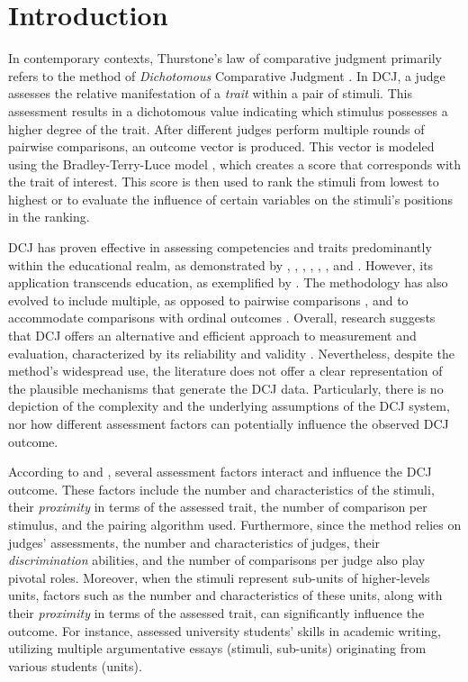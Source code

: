 \documentclass[
  authoryear,
  preprint,
  1p]{elsarticle}
\begin{document}
\section{Introduction}\label{sec-introduction}

In contemporary contexts, Thurstone's law of comparative judgment
\citeyearpar{Thurstone_1927} primarily refers to the method of
\emph{Dichotomous} Comparative Judgment
\citep[DCJ,][]{Pollitt_2012a, Pollitt_2012b}. In DCJ, a judge assesses
the relative manifestation of a \emph{trait} within a pair of stimuli.
This assessment results in a dichotomous value indicating which stimulus
possesses a higher degree of the trait. After different judges perform
multiple rounds of pairwise comparisons, an outcome vector is produced.
This vector is modeled using the Bradley-Terry-Luce model
\citep[BTL,][]{Bradley_et_al_1952, Luce_1959}, which creates a score
that corresponds with the trait of interest. This score is then used to
rank the stimuli from lowest to highest or to evaluate the influence of
certain variables on the stimuli's positions in the ranking.

DCJ has proven effective in assessing competencies and traits
predominantly within the educational realm, as demonstrated by
\citet{Pollitt_2012b}, \citet{Jones_2015}, \citet{vanDaal_et_al_2016},
\citet{Bartholomew_et_al_2018}, \citet{Lesterhuis_2018},
\citet{Bartholomew_et_al_2020}, and \citet{Marshall_et_al_2020}.
However, its application transcends education, as exemplified by
\citet{Boonen_et_al_2020}. The methodology has also evolved to include
multiple, as opposed to pairwise comparisons
\citep{Luce_1959, Placket_1975}, and to accommodate comparisons with
ordinal outcomes \citep{Tutz_1986, Agresti_1992}. Overall, research
suggests that DCJ offers an alternative and efficient approach to
measurement and evaluation, characterized by its reliability and
validity \citep{Lesterhuis_2018, vanDaal_2020, Marshall_et_al_2020}.
Nevertheless, despite the method's widespread use, the literature does
not offer a clear representation of the plausible mechanisms that
generate the DCJ data. Particularly, there is no depiction of the
complexity and the underlying assumptions of the DCJ system, nor how
different assessment factors can potentially influence the observed DCJ
outcome.

According to \citet{Verhavert_et_al_2019} and \citet{vanDaal_2020},
several assessment factors interact and influence the DCJ outcome. These
factors include the number and characteristics of the stimuli, their
\emph{proximity} in terms of the assessed trait, the number of
comparison per stimulus, and the pairing algorithm used. Furthermore,
since the method relies on judges' assessments, the number and
characteristics of judges, their \emph{discrimination} abilities, and
the number of comparisons per judge also play pivotal roles. Moreover,
when the stimuli represent sub-units of higher-levels units, factors
such as the number and characteristics of these units, along with their
\emph{proximity} in terms of the assessed trait, can significantly
influence the outcome. For instance, \citet{vanDaal_et_al_2016} assessed
university students' skills in academic writing, utilizing multiple
argumentative essays (stimuli, sub-units) originating from various
students (units).
\end{document}
